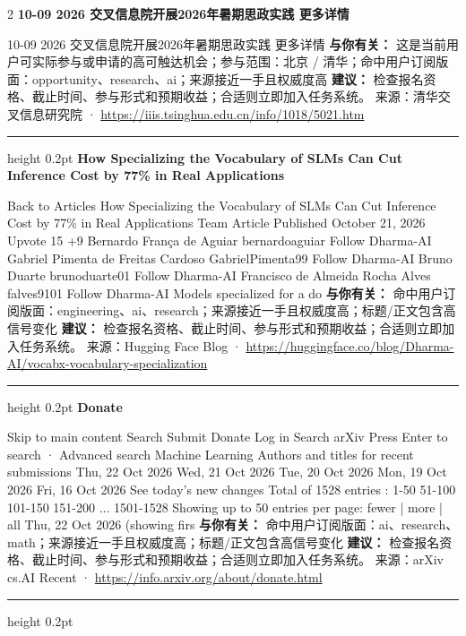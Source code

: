 \documentclass[10.5pt]{ctexart}
\begin{document}
\begin{multicols}{2}
{\large\bfseries 10-09 2026 交叉信息院开展2026年暑期思政实践 更多详情}\par
10-09 2026 交叉信息院开展2026年暑期思政实践 更多详情
\textbf{与你有关：} 这是当前用户可实际参与或申请的高可触达机会；参与范围：北京 / 清华；命中用户订阅版面：opportunity、research、ai；来源接近一手且权威度高
\textbf{建议：} 检查报名资格、截止时间、参与形式和预期收益；合适则立即加入任务系统。
{\footnotesize\color{ormuted} 来源：清华交叉信息研究院 · \url{https://iiis.tsinghua.edu.cn/info/1018/5021.htm}}
\vspace{2mm}
\hrule height 0.2pt
\vspace{2mm}
{\large\bfseries How Specializing the Vocabulary of SLMs Can Cut Inference Cost by 77\% in Real Applications}\par
Back to Articles How Specializing the Vocabulary of SLMs Can Cut Inference Cost by 77\% in Real Applications Team Article Published October 21, 2026 Upvote 15 +9 Bernardo França de Aguiar bernardoaguiar Follow Dharma-AI Gabriel Pimenta de Freitas Cardoso GabrielPimenta99 Follow Dharma-AI Bruno Duarte brunoduarte01 Follow Dharma-AI Francisco de Almeida Rocha Alves falves9101 Follow Dharma-AI Models specialized for a do
\textbf{与你有关：} 命中用户订阅版面：engineering、ai、research；来源接近一手且权威度高；标题/正文包含高信号变化
\textbf{建议：} 检查报名资格、截止时间、参与形式和预期收益；合适则立即加入任务系统。
{\footnotesize\color{ormuted} 来源：Hugging Face Blog · \url{https://huggingface.co/blog/Dharma-AI/vocabx-vocabulary-specialization}}
\vspace{2mm}
\hrule height 0.2pt
\vspace{2mm}
{\large\bfseries Donate}\par
Skip to main content Search Submit Donate Log in Search arXiv Press Enter to search · Advanced search Machine Learning Authors and titles for recent submissions Thu, 22 Oct 2026 Wed, 21 Oct 2026 Tue, 20 Oct 2026 Mon, 19 Oct 2026 Fri, 16 Oct 2026 See today's new changes Total of 1528 entries : 1-50 51-100 101-150 151-200 ... 1501-1528 Showing up to 50 entries per page: fewer | more | all Thu, 22 Oct 2026 (showing firs
\textbf{与你有关：} 命中用户订阅版面：ai、research、math；来源接近一手且权威度高；标题/正文包含高信号变化
\textbf{建议：} 检查报名资格、截止时间、参与形式和预期收益；合适则立即加入任务系统。
{\footnotesize\color{ormuted} 来源：arXiv cs.AI Recent · \url{https://info.arxiv.org/about/donate.html}}
\vspace{2mm}
\hrule height 0.2pt

\end{multicols}
\end{document}

